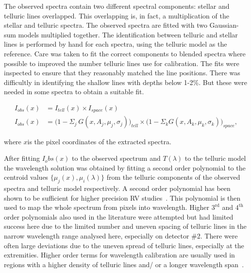 The observed spectra contain two different spectral components: stellar and telluric lines overlapped. This overlapping is, in fact, a multiplication of the stellar and telluric spectra. The observed spectra are fitted with two Gaussian-sum models multiplied together. The identification between telluric and stellar lines is performed by hand for each spectra, using the telluric model as the reference. Care was taken to fit the correct components to blended spectra where possible to improved the number telluric lines use for calibration. The fits were inspected to ensure that they reasonably matched the line positions. There was difficultly in identifying the shallow lines with depths below 1-2\%. But these were needed in some spectra to obtain a suitable fit.

\begin{align}
I_{obs}(x) &= I_{tell}(x) \times I_{space}(x) \nonumber \\
I_{obs}(x) &= \Big(1 - {\Sigma}_{j}\ G(x, A_{j}, {\mu}_{j}, {\sigma}_{j})\Big)_{tell} \times \Big(1 - {\Sigma}_{k} G(x, A_{k}, {\mu}_{k}, {\sigma}_{k})\Big)_{space}, \label{eqn:obs}
\end{align}

where \(x\)is the pixel coordinates of the extracted spectra.


After fitting \(I_obs(x)\) to the observed spectrum and \(T(\lambda)\) to the telluric model the wavelength solution was obtained by fitting a second order polynomial to the centroid values \(\{\mu_{j}(x), \mu_{i}(\lambda)\}\) from the telluric components of the observed spectra and telluric model respectively. A second order polynomial has been shown to be sufficient for higher precision RV studies~\citep[e.g.][]{bean_groundbased_2010, figueira_radial_2010}. This polynomial is then used to map the whole spectrum from pixels into wavelength. Higher \(3^{\textrm{rd}}\) and \(4^{\textrm{th}}\) order polynomials also used in the literature \citet[e.g.][]{seifahrt_synthesising_2010, ulmer-moll_telluric_2018} were attempted but had limited success here due to the limited number and uneven spacing of telluric lines in the narrow wavelength range analysed here, especially on detector \#2. There were often large deviations due to the uneven spread of telluric lines, especially at the extremities. Higher order terms for wavelength calibration are usually used in regions with a higher density of telluric lines and/ or a longer wavelength span~\citep{piskorz_evidence_2016, seifahrt_synthesising_2010, ulmer-moll_telluric_2018}.

